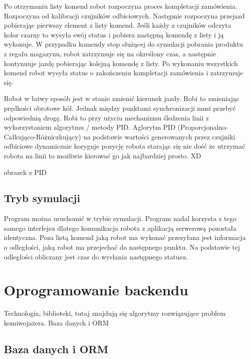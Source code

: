 Po otrzymaniu listy komend robot rozpoczyna proces kompletacji zamówienia. Rozpoczyna od kalibracji czujników odbiciowych. Następnie rozpoczyna przejazd pobierając pierwszy element z listy komend. Jeśli każdy z czujników odczyta kolor czarny to wysyła swój status i pobiera następną komendę z listy i ją wykonuje. W przypadku komendy stop służącej do symulacji pobrania produktu z regału magazynu, robot zatrzymuje się na określony czas, a następnie kontynuuje jazdę pobierając kolejną komendę z listy. Po wykonaniu wszystkich komend robot wysyła status o zakończeniu kompletacji zamówienia i zatrzymuje się.

Robot w łatwy sposób jest w stanie zmienić kierunek jazdy. Robi to zmieniając prędkości obrotowe kół. Jednak między punktami synchronizacji musi przebyć odpowiednią drogę. Robi to przy użyciu mechanizmu śledzenia linii z wykorzystaniem algorytmu / metody PID. Aglorytm PID (Proporcjonalno-Całkująco-Różniczkujący) na podstawie wartości generowanych przez czujniki odbiciowe dynamicznie koryguje pozycję robota starając się nie dość że utrzymać robota na linii to możliwie kierować go jak najbardziej prosto. XD 

obrazek z PID

\subsection{Tryb symulacji}
\label{sec:symulacjaRobota}

Program można uruchomić w trybie symulacji. Program nadal korzysta z tego samego interfejsu dlatego komunikacja robota z aplikacją serwerową pozostała identyczna. Poza listą komend jaką robot ma wykonać przesyłana jest informacja o odległości, jaką robot ma przejechać do następnego punktu. Na podstawie tej odległości obliczany jest czas do wysłania następnego statusu.


\section{Oprogramowanie backendu}
\label{sec:oprogramowanieBackendu}

Technologia, biblioteki, tutaj znajdują się algorytmy rozwiązujące problem komiwojażera. Baza danych i ORM


\subsection{Baza danych i ORM}
\label{sec:bazaDanychOrm}

